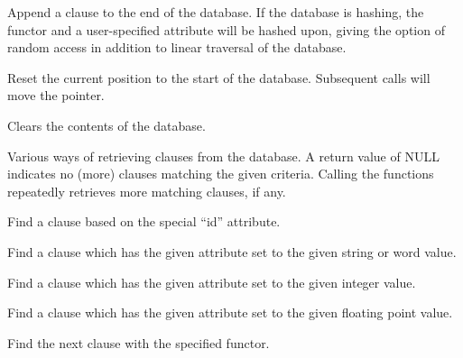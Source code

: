 

Append a clause to the end of the database. If the database is hashing,
the functor and a user-specified attribute will be hashed upon, giving the
option of random access in addition to linear traversal of the database.



Reset the current position to the start of the database. Subsequent
\/ calls will move the pointer.



Clears the contents of the database.


Various ways of retrieving clauses from the database. A return
value of NULL indicates no (more) clauses matching the given criteria.
Calling the functions repeatedly retrieves more matching clauses, if any.


Find a clause based on the special ``id'' attribute.


Find a clause which has the given attribute set to the given string or word value.


Find a clause which has the given attribute set to the given integer value.


Find a clause which has the given attribute set to the given floating point value.



Find the next clause with the specified functor.


